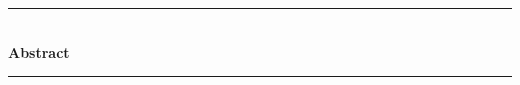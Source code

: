 \begin{vcentrepage}
\noindent\rule[2pt]{\textwidth}{0.2pt}\\

{\center\large\textbf{Abstract}\\}
\doublespacing

    \lipsum[1-2]



\noindent\rule[2pt]{\textwidth}{0.8pt}
\end{vcentrepage}

\restoregeometry
